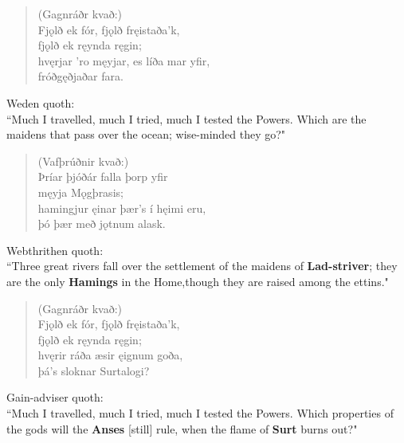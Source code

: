 \begin{verse}
(Gagnráðr kvað:) \\%
\bva Fjǫlð ek fór, \hld fjǫlð fręistaða'k, \\%
\ind fjǫlð ek ręynda ręgin; \\%
hvęrjar 'ro męyjar, \hld es líða mar yfir, \\%
\ind fróðgęðjaðar fara.\\%
\end{verse}

\bvb Weden quoth: \\ “Much I travelled, much I tried, much I tested the Powers. Which are the maidens that pass over the ocean; wise-minded they go?" \\

\begin{verse}
(Vafþrúðnir kvað:) \\%
\bva Þríar þjóðár \hld falla þorp yfir \\%
\ind męyja Mǫgþrasis; \\%
hamingjur ęinar \hld þær's í hęimi eru, \\%
\ind þó þær með jǫtnum alask.\\%
\end{verse}

\bvb Webthrithen quoth: \\ “Three great rivers fall over the settlement of the maidens of \textbf{Lad-striver}; they are the only \textbf{Hamings} in the Home,\footnotemark[99] though they are raised among the ettins\footnotemark[100]." \\

\begin{verse}
(Gagnráðr kvað:) \\%
\bva Fjǫlð ek fór, \hld fjǫlð fręistaða'k, \\%
\ind fjǫlð ek ręynda ręgin; \\%
hvęrir ráða æsir \hld ęignum goða, \\%
\ind þá's sloknar Surtalogi?\\%
\end{verse}

\bvb Gain-adviser quoth: \\ “Much I travelled, much I tried, much I tested the Powers. Which properties of the gods will the \textbf{Anses} [still] rule\footnotemark[105], when the flame of \textbf{Surt} burns out?" \\

